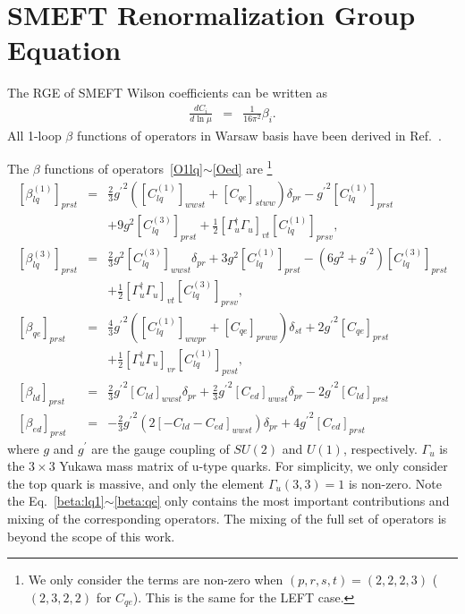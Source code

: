 \documentclass[a4paper,11pt]{article}
\begin{document}
\section{SMEFT Renormalization Group Equation}\label{smeftrge}
The RGE of SMEFT Wilson coefficients can be written as 
\begin{eqnarray}
  \frac{dC_i}{d\ln{\mu}} &=& \frac{1}{16\pi^2}\beta_i. \label{beta:definition}
\end{eqnarray}
All 1-loop $\beta$ functions of operators in Warsaw basis have been derived in Ref.~\cite{Celis:2017hod}. 

The $\beta$ functions of operators~\ref{O1lq}$\sim$\ref{Oed} are
\footnote{We only consider the terms are non-zero when $(p,r,s,t)=(2,2,2,3)$ ($(2,3,2,2)$ for $C_{qe}$). This is the same for the LEFT case.}
\begin{eqnarray}
   \left[\beta^{(1)}_{lq}\right]_{prst} &=& \frac{2}{3}{g^\prime}^2\left([C^{(1)}_{lq}]_{wwst}+[C_{qe}]_{stww}\right)\delta_{pr}-{g^\prime}^2[C^{(1)}_{lq}]_{prst}  \nonumber \\
   &&+9g^2[C^{(3)}_{lq}]_{prst}+\frac{1}{2}[\Gamma_u^\dagger\Gamma_u]_{vt}[C^{(1)}_{lq}]_{prsv}, \label{beta:lq1}  \\
   \left[\beta^{(3)}_{lq}\right]_{prst} &=& \frac{2}{3}g^2[C^{(3)}_{lq}]_{wwst}\delta_{pr}+3g^2[C^{(1)}_{lq}]_{prst}-(6g^2+{g^\prime}^2)[C^{(3)}_{lq}]_{prst}  \nonumber \\ 
   && +\frac{1}{2}[\Gamma_u^\dagger\Gamma_u]_{vt}[C^{(3)}_{lq}]_{prsv}, \label{beta:lq3} \\
   \left[\beta_{qe}\right]_{prst} &=& \frac{4}{3}{g^{\prime}}^2\left([C^{(1)}_{lq}]_{wwpr}+[C_{qe}]_{prww}\right)\delta_{st}+2{g^{\prime}}^2[C_{qe}]_{prst} \nonumber  \\
   && +\frac{1}{2}[\Gamma_u^\dagger\Gamma_u]_{vr}[C^{(1)}_{lq}]_{pvst}, \label{beta:qe} \\
   \left[\beta_{ld}\right]_{prst}  &=& \frac{2}{3}{g^\prime}^2[C_{ld}]_{wwst}\delta_{pr}+\frac{2}{3}{g^\prime}^2[C_{ed}]_{wwst}\delta_{pr}-2{g^\prime}^2[C_{ld}]_{prst} \\
  \left[\beta_{ed}\right]_{prst} &=& -\frac{2}{3}{g^\prime}^2\left(2[-C_{ld}-C_{ed}]_{wwst}\right)\delta_{pr}+4{g^{\prime}}^2[C_{ed}]_{prst}
\end{eqnarray}
where $g$ and $g^\prime$ are the gauge coupling of $SU(2)$ and $U(1)$, respectively. 
$\Gamma_{u}$ is the $3\times 3$ Yukawa mass matrix of u-type quarks. 
For simplicity, we only consider the top quark is massive, 
and only the element $\Gamma_u(3,3)=1$ is non-zero.
Note the Eq.~\ref{beta:lq1}$\sim$\ref{beta:qe} only contains the most important contributions and mixing of the corresponding operators. 
The mixing of the full set of operators is beyond the scope of this work. 
\end{document}
